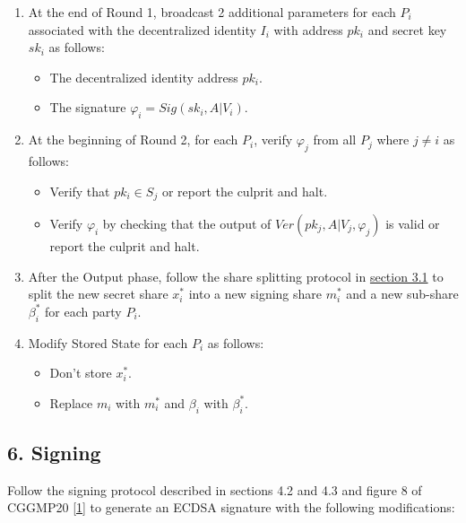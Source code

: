 \documentclass[
]{article}
\providecommand{\tightlist}{%
  \setlength{\itemsep}{0pt}\setlength{\parskip}{0pt}}
\begin{document}
\begin{enumerate}
\def\labelenumi{\arabic{enumi}.}
\tightlist
\item
  At the end of Round 1, broadcast 2 additional parameters for each
  \(P_i\) associated with the decentralized identity \(I_i\) with
  address \(pk_i\) and secret key \(sk_i\) as follows:

  \begin{itemize}
  \tightlist
  \item
    The decentralized identity address \(pk_i\).
  \item
    The signature \(\varphi _i = Sig(sk_i, A | V_i)\).
  \end{itemize}
\item
  At the beginning of Round 2, for each \(P_i\), verify \(\varphi _j\)
  from all \(P_j\) where \(j \neq i\) as follows:

  \begin{itemize}
  \tightlist
  \item
    Verify that \(pk_i \in S_j\) or report the culprit and halt.
  \item
    Verify \(\varphi _i\) by checking that the output of
    \(Ver(pk_j, A | V_j, \varphi _j)\) is valid or report the culprit
    and halt.
  \end{itemize}
\item
  After the Output phase, follow the share splitting protocol in
  \protect\hyperlink{share-splitting}{section 3.1} to split the new
  secret share \(x_i^\ast\) into a new signing share \(m_i^\ast\) and a
  new sub-share \(\beta _i^\ast\) for each party \(P_i\).
\item
  Modify Stored State for each \(P_i\) as follows:

  \begin{itemize}
  \tightlist
  \item
    Don't store \(x_i^\ast\).
  \item
    Replace \(m_i\) with \(m_i^\ast\) and \(\beta _i\) with
    \(\beta _i^\ast\).
  \end{itemize}
\end{enumerate}

\hypertarget{signing}{%
\subsection{6. Signing}\label{signing}}

Follow the signing protocol described in sections 4.2 and 4.3 and figure
8 of CGGMP20 {[}\protect\hyperlink{ref-cggmp20}{1}{]} to generate an
ECDSA signature with the following modifications:
\end{document}
